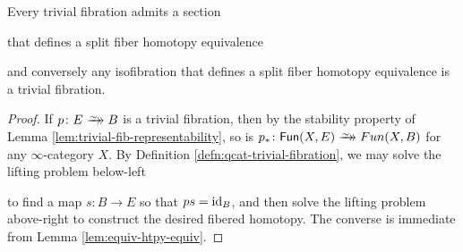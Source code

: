 \begin{lem}\label{lem:split-triv-fib}
  Every trivial fibration admits a section
\begin{center}
\end{center}
that defines a split fiber homotopy equivalence
\begin{center}
\end{center}
and conversely any isofibration that defines a split fiber homotopy equivalence is a trivial fibration.
\end{lem}
\begin{proof}
If $p \colon E \trvfib B$ is a trivial fibration, then by the stability property of Lemma \ref{lem:trivial-fib-representability}, so is $p_*\colon\Fun(X,E)\trvfib Fun(X,B)$ for any $\infty$-category $X$.  By Definition \ref{defn:qcat-trivial-fibration}, we may solve the lifting problem below-left
\begin{center}
\end{center}
to find a map $s \colon B \to E$ so that $ps = \textup{id}_B$, and then solve the lifting problem above-right to construct the desired fibered homotopy. The converse is immediate from Lemma \ref{lem:equiv-htpy-equiv}.
\end{proof}

